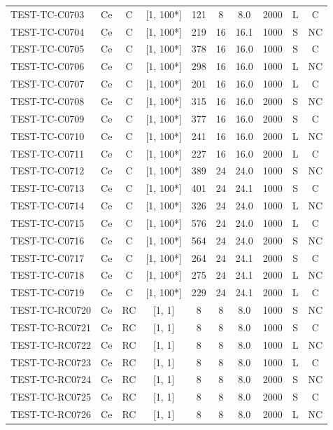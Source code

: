 \begin{longtable}{lccccccccc}
TEST-TC-C0703 & Ce & C & [1, 100*] & 121 & 8 & 8.0 & 2000 & L & C \\
TEST-TC-C0704 & Ce & C & [1, 100*] & 219 & 16 & 16.1 & 1000 & S & NC \\
TEST-TC-C0705 & Ce & C & [1, 100*] & 378 & 16 & 16.0 & 1000 & S & C \\
TEST-TC-C0706 & Ce & C & [1, 100*] & 298 & 16 & 16.0 & 1000 & L & NC \\
TEST-TC-C0707 & Ce & C & [1, 100*] & 201 & 16 & 16.0 & 1000 & L & C \\
TEST-TC-C0708 & Ce & C & [1, 100*] & 315 & 16 & 16.0 & 2000 & S & NC \\
TEST-TC-C0709 & Ce & C & [1, 100*] & 377 & 16 & 16.0 & 2000 & S & C \\
TEST-TC-C0710 & Ce & C & [1, 100*] & 241 & 16 & 16.0 & 2000 & L & NC \\
TEST-TC-C0711 & Ce & C & [1, 100*] & 227 & 16 & 16.0 & 2000 & L & C \\
TEST-TC-C0712 & Ce & C & [1, 100*] & 389 & 24 & 24.0 & 1000 & S & NC \\
TEST-TC-C0713 & Ce & C & [1, 100*] & 401 & 24 & 24.1 & 1000 & S & C \\
TEST-TC-C0714 & Ce & C & [1, 100*] & 326 & 24 & 24.0 & 1000 & L & NC \\
TEST-TC-C0715 & Ce & C & [1, 100*] & 576 & 24 & 24.0 & 1000 & L & C \\
TEST-TC-C0716 & Ce & C & [1, 100*] & 564 & 24 & 24.0 & 2000 & S & NC \\
TEST-TC-C0717 & Ce & C & [1, 100*] & 264 & 24 & 24.1 & 2000 & S & C \\
TEST-TC-C0718 & Ce & C & [1, 100*] & 275 & 24 & 24.1 & 2000 & L & NC \\
TEST-TC-C0719 & Ce & C & [1, 100*] & 229 & 24 & 24.1 & 2000 & L & C \\
TEST-TC-RC0720 & Ce & RC & [1, 1] & 8 & 8 & 8.0 & 1000 & S & NC \\
TEST-TC-RC0721 & Ce & RC & [1, 1] & 8 & 8 & 8.0 & 1000 & S & C \\
TEST-TC-RC0722 & Ce & RC & [1, 1] & 8 & 8 & 8.0 & 1000 & L & NC \\
TEST-TC-RC0723 & Ce & RC & [1, 1] & 8 & 8 & 8.0 & 1000 & L & C \\
TEST-TC-RC0724 & Ce & RC & [1, 1] & 8 & 8 & 8.0 & 2000 & S & NC \\
TEST-TC-RC0725 & Ce & RC & [1, 1] & 8 & 8 & 8.0 & 2000 & S & C \\
TEST-TC-RC0726 & Ce & RC & [1, 1] & 8 & 8 & 8.0 & 2000 & L & NC \\

\end{longtable}
